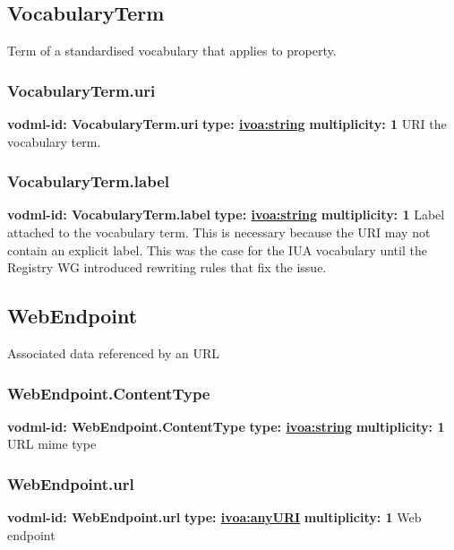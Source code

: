   \subsection{VocabularyTerm}
  \label{sect:VocabularyTerm}
    Term of a standardised vocabulary that applies to property.

    \subsubsection{VocabularyTerm.uri}
      \textbf{vodml-id: VocabularyTerm.uri} \newline
      \textbf{type: \hyperref[sect:ivoa]{ivoa:string}} \newline
      \textbf{multiplicity: 1} \newline 
      URI the vocabulary term.

    \subsubsection{VocabularyTerm.label}
      \textbf{vodml-id: VocabularyTerm.label} \newline
      \textbf{type: \hyperref[sect:ivoa]{ivoa:string}} \newline
      \textbf{multiplicity: 1} \newline 
      Label attached to the vocabulary term. This is necessary because the URI may not contain an explicit label. This was the case for the IUA vocabulary until the Registry WG introduced rewriting rules that fix the issue.

  \subsection{WebEndpoint}
  \label{sect:WebEndpoint}
    Associated data referenced by an URL

    \subsubsection{WebEndpoint.ContentType}
      \textbf{vodml-id: WebEndpoint.ContentType} \newline
      \textbf{type: \hyperref[sect:ivoa]{ivoa:string}} \newline
      \textbf{multiplicity: 1} \newline 
      URL mime type

    \subsubsection{WebEndpoint.url}
      \textbf{vodml-id: WebEndpoint.url} \newline
      \textbf{type: \hyperref[sect:ivoa]{ivoa:anyURI}} \newline
      \textbf{multiplicity: 1} \newline 
      Web endpoint


